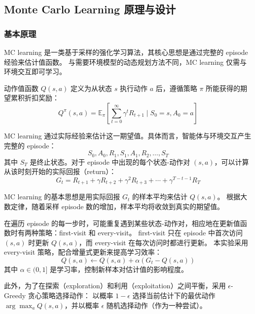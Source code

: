 \subsection{Monte Carlo Learning 原理与设计}

\subsubsection{基本原理}

MC learning 是一类基于采样的强化学习算法，其核心思想是通过完整的 episode 经验来估计值函数。
与需要环境模型的动态规划方法不同，MC learning 仅需与环境交互即可学习。

动作值函数 $Q(s,a)$ 定义为从状态 $s$ 执行动作 $a$ 后，遵循策略 $\pi$ 所能获得的期望累积折扣奖励：
\begin{equation}
    \label{eq:q_function}
    Q^\pi(s,a) = \mathbb{E}_\pi \left[ \sum_{t=0}^\infty \gamma^t R_{t+1} \mid S_0 = s, A_0 = a \right]
\end{equation}

MC learning 通过实际经验来估计这一期望值。具体而言，智能体与环境交互产生完整的 episode：
\begin{equation}
    \label{eq:trajectory}
    S_0, A_0, R_1, S_1, A_1, R_2, \ldots, S_T
\end{equation}
其中 $S_T$ 是终止状态。对于 episode 中出现的每个状态-动作对 $(s,a)$，可以计算从该时刻开始的实际回报（return）：
\begin{equation}
    \label{eq:return}
    G_t = R_{t+1} + \gamma R_{t+2} + \gamma^2 R_{t+3} + \cdots + \gamma^{T-t-1} R_T
\end{equation}

MC learning 的基本思想是用实际回报 $G_t$ 的样本平均来估计 $Q(s,a)$。
根据大数定律，随着采样 episode 数的增加，样本平均将收敛到真实的期望值。

在遍历 episode 的每一步时，可能重复遇到某些状态-动作对，相应地在更新值函数时有两种策略：first-visit 和 every-visit。
first-visit 只在 episode 中首次访问 $(s,a)$ 时更新 $Q(s,a)$，而 every-visit 在每次访问时都进行更新。
本实验采用 every-visit 策略，配合增量式更新来提高学习效率：
\begin{equation}
    \label{eq:mc_update}
    Q(s,a) \leftarrow Q(s,a) + \alpha \left( G_t - Q(s,a) \right)
\end{equation}
其中 $\alpha \in (0,1]$ 是学习率，控制新样本对估计值的影响程度。

此外，为了在探索（exploration）和利用（exploitation）之间平衡，采用 $\epsilon$-Greedy 贪心策略选择动作：
以概率 $1-\epsilon$ 选择当前估计下的最优动作 $\arg\max_a Q(s,a)$，并以概率 $\epsilon$ 随机选择动作（作为一种尝试）。


